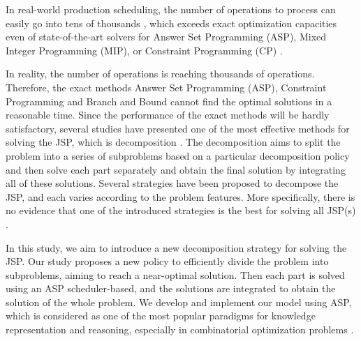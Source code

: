 \documentclass{tlp} %
\begin{document}

In real-world production scheduling, the number of operations to process can easily go
into tens of thousands \citep{coltep19a,kohakamo20a,kotakoscge21a}, which exceeds exact
optimization capacities even of state-of-the-art solvers for Answer Set Programming (ASP),
Mixed Integer Programming (MIP), or Constraint Programming (CP)
\citep{daneshamooz2021mathematical,francescutto2021solving,shi2021solving}.


In reality, the number of operations is reaching thousands of operations. Therefore, the exact methods Answer Set Programming (ASP), Constraint Programming and Branch and Bound cannot find the optimal solutions in a reasonable time\cite{daneshamooz2021mathematical,shi2021solving,francescutto2021solving}. Since the performance of the exact methods will be hardly satisfactory, several studies have presented one of the most effective methods for solving the JSP, which is decomposition \cite{zhang2010hybrid}. The decomposition aims to split the problem into a series of subproblems based on a particular decomposition policy and then solve each part separately and obtain the final solution by integrating all of these solutions. Several strategies have been proposed to decompose the JSP, and each varies according to the problem features. More specifically, there is no evidence that one of the introduced strategies is the best for solving all JSP(s) \cite{ovacik2012decomposition}. 

In this study, we aim to introduce a new decomposition strategy for solving the JSP. Our study proposes a new policy to efficiently divide the problem into subproblems, aiming to reach a near-optimal solution. Then each part is solved using an ASP scheduler-based, and the solutions are integrated to obtain the solution of the whole problem. We develop and implement our model using ASP, which is considered as one of the most popular paradigms for knowledge representation and reasoning, especially in combinatorial optimization problems \cite{abseher2016shift}. 
\end{document}
